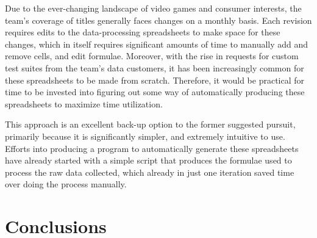 \documentclass[12pt]{article}
\begin{document}
\indent\hspace{0.5in} Due to the ever-changing landscape of video games and consumer interests, the team's coverage of titles generally faces changes on a monthly basis. Each revision requires edits to the data-processing spreadsheets to make space for these changes, which in itself requires significant amounts of time to manually add and remove cells, and edit formulae. Moreover, with the rise in requests for custom test suites from the team's data customers, it has been increasingly common for these spreadsheets to be made from scratch. Therefore, it would be practical for time to be invested into figuring out some way of automatically producing these spreadsheets to maximize time utilization.
	
\indent\hspace{0.5in} This approach is an excellent back-up option to the former suggested pursuit, primarily because it is significantly simpler, and extremely intuitive to use. Efforts into producing a program to automatically generate these spreadsheets have already started with a simple script that produces the formulae used to process the raw data collected, which already in just one iteration saved time over doing the process manually.





\newpage
\section{Conclusions}

\end{document}
